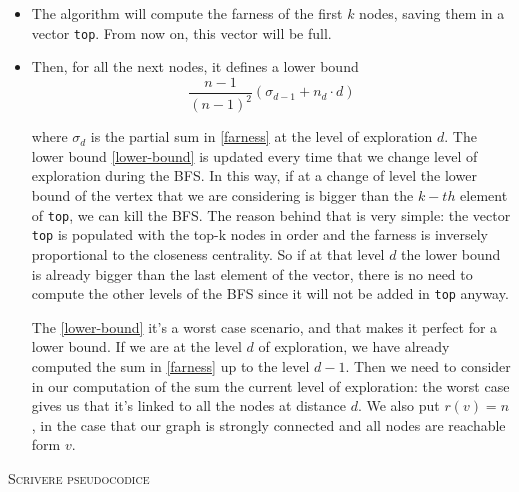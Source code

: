 \begin{itemize}
    \item The algorithm will compute the farness of the first $k$ nodes, saving them in a vector \texttt{top}. From now on, this vector will be full.

    \item Then, for all the next nodes, it defines a lower bound
    \begin{equation}\label{lower-bound}
        \frac{n-1}{(n-1)^2} (\sigma_{d-1} + n_d \cdot d)
    \end{equation}

    where $\sigma_d$ is the partial sum in \eqref{farness} at the level of exploration $d$. The lower bound \eqref{lower-bound} is updated every time that we change level of exploration during the BFS. In this way, if at a change of level the lower bound of the vertex that we are considering is bigger than the $k-th$ element of \texttt{top}, we can kill the BFS. The reason behind that is very simple: the vector \texttt{top} is populated with the top-k nodes in order and the farness is inversely proportional to the closeness centrality. So if at that level $d$ the lower bound is already bigger than the last element of the vector, there is no need to compute the other levels of the BFS since it will not be added in \texttt{top} anyway. \s

    The \eqref{lower-bound} it's a worst case scenario, and that makes it perfect for a lower bound. If we are at the level $d$ of exploration, we have already computed the sum in \eqref{farness} up to the level $d-1$. Then we need to consider in our computation of the sum the current level of exploration: the worst case gives us that it's linked to all the nodes at distance $d$. We also put $r(v)=n$, in the case that our graph is strongly connected and all nodes are reachable form $v$.
\end{itemize}

\textsc{Scrivere pseudocodice}




